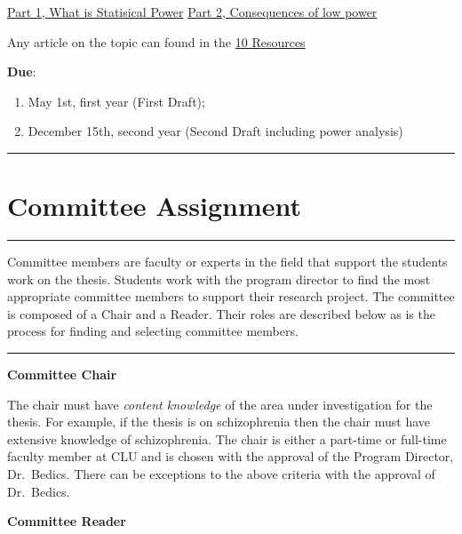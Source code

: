 \documentclass[openany]{book}
\providecommand{\tightlist}{%
  \setlength{\itemsep}{0pt}\setlength{\parskip}{0pt}}
\begin{document}
\href{https://www.youtube.com/watch?v=-ZU7fbvSJ60}{Part 1, What is Statisical Power}
\href{https://www.youtube.com/watch?v=7daQRvRO-NE}{Part 2, Consequences of low power}

Any article on the topic can found in the \protect\hyperlink{resources}{10 Resources}

\textbf{Due}:

\begin{enumerate}
\def\labelenumi{\arabic{enumi}.}
\tightlist
\item
  May 1st, first year (First Draft);
\item
  December 15th, second year (Second Draft including power analysis)
\end{enumerate}

\begin{center}\rule{0.5\linewidth}{0.5pt}\end{center}

\hypertarget{committee-assignment}{%
\section{Committee Assignment}\label{committee-assignment}}

\begin{center}\rule{0.5\linewidth}{0.5pt}\end{center}

Committee members are faculty or experts in the field that support the students work on the thesis. Students work with the program director to find the most appropriate committee members to support their research project. The committee is composed of a Chair and a Reader. Their roles are described below as is the process for finding and selecting committee members.

\begin{center}\rule{0.5\linewidth}{0.5pt}\end{center}

\textbf{Committee Chair}

The chair must have \emph{content knowledge} of the area under investigation for the thesis. For example, if the thesis is on schizophrenia then the chair must have extensive knowledge of schizophrenia. The chair is either a part-time or full-time faculty member at CLU and is chosen with the approval of the Program Director, Dr.~Bedics. There can be exceptions to the above criteria with the approval of Dr.~Bedics.

\textbf{Committee Reader}
\end{document}
